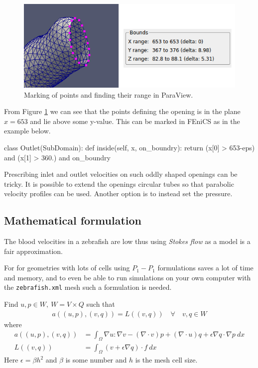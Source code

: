 \documentclass[epsfig,11pt]{article}
\begin{document}
\begin{figure}[h!] 
\begin{center}
  \includegraphics[scale=0.5]{marking.png}
  \end{center}
  \caption{Marking of points and finding their range in ParaView.}
      \label{fig:marking_paraview}
\end{figure}

From Figure \ref{fig:marking_paraview} we can see that the points defining the opening is in the plane $x = 653$ and lie above some y-value. This can be marked in FEniCS as in the example below.

\begin{python}
class Outlet(SubDomain): 
	def inside(self, x, on_boundry):
		return (x[0] > 653-eps) and (x[1] > 360.) and on_boundry
\end{python}

Prescribing inlet and outlet velocities on such oddly shaped openings can be tricky. It is possible to extend the openings circular tubes so that parabolic velocity profiles can be used. Another option is to instead set the pressure. 

\subsection{Mathematical formulation}

The blood velocities in a zebrafish are low thus using \emph{Stokes flow} as a model is a fair approximation.

For for geometries with lots of cells using $P_1-P_1$ formulations saves a lot of time and memory, and to even be able to run simulations on your own computer with the \texttt{zebrafish.xml} mesh such a formulation is needed. 

Find $u,p \in W,\: W = V \times Q $ such that
\begin{align*}
a((u,p),(v,q)) = L((v,q)) \quad \forall \quad v,q \in W 
\end{align*}
where
\begin{align*}
a((u,p),(v,q)) &= \int_\Omega \nabla u : \nabla v - (\nabla \cdot v)p + (\nabla \cdot u)q + \epsilon \nabla q \cdot \nabla p \: dx \\
L((v,q)) &= \int_\Omega  (v + \epsilon \nabla q) \cdot f \: dx
\end{align*}
Here \(\epsilon = \beta h^2\) and \(\beta\) is some number and \(h\) is the mesh cell size.
\end{document}
